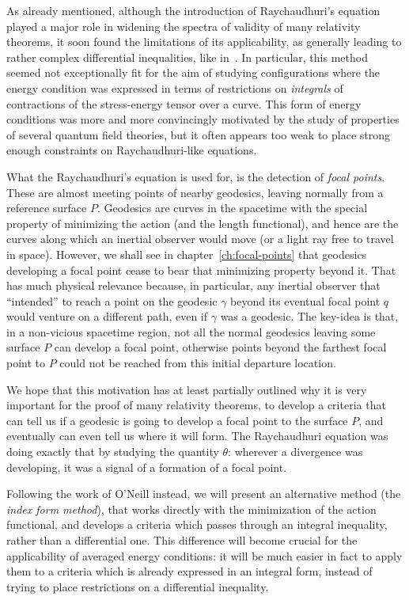 As already mentioned, although the introduction of Raychaudhuri's equation played a major role in widening the spectra of validity of many relativity theorems, it soon found the limitations of its applicability, as generally leading to rather complex differential inequalities, like in~\cite[]{fewster2011singularity}.
In particular, this method seemed not exceptionally fit for the aim of studying configurations where the energy condition was expressed in terms of restrictions on \emph{integrals} of contractions of the stress-energy tensor over a curve. This form of energy conditions was more and more convincingly motivated by the study of properties of several quantum field theories, but it often appears too weak to place strong enough constraints on Raychaudhuri-like equations.

What the Raychaudhuri's equation is used for, is the detection of \emph{focal points}. These are almost meeting points of nearby geodesics, leaving normally from a reference surface \(P\). Geodesics are curves in the spacetime with the special property of minimizing the action (and the length functional), and hence are the curves along which an inertial observer would move (or a light ray free to travel in space). However, we shall see in chapter~\ref{ch:focal-points} that geodesics developing a focal point cease to bear that minimizing property beyond it. 
That has much physical relevance because, in particular, any inertial observer that ``intended'' to reach a point on the geodesic \(\gamma\) beyond its eventual focal point \(q\) would venture on a different path, even if \(\gamma\) was a geodesic.
The key-idea is that, in a non-vicious spacetime region, not all the normal geodesics leaving some surface \(P\) can develop a focal point, otherwise points beyond the farthest focal point to \(P\) could not be reached from this initial departure location. 

We hope that this motivation has at least partially outlined why it is very important for the proof of many relativity theorems, to develop a criteria that can tell us if a geodesic is going to develop a focal point to the surface \(P\), and eventually can even tell us where it will form. The Raychaudhuri equation was doing exactly that by studying the quantity \(\theta\): wherever a divergence was developing, it was a signal of a formation of a focal point.

Following the work of O'Neill instead, we will present an alternative method (the \emph{index form method}), that works directly with the minimization of the action functional, and develops a criteria which passes through an integral inequality, rather than a differential one. This difference will become crucial for the applicability of averaged energy conditions: it will be much easier in fact to apply them to a criteria which is already expressed in an integral form, instead of trying to place restrictions on a differential inequality.

